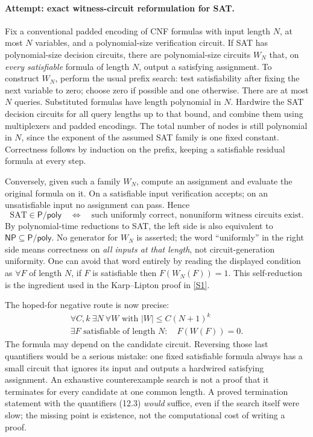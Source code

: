 \documentclass[11pt,a4paper]{article}
\newcommand{\sref}[2]{\hyperlink{source:#1:#2}{[S#2]}}
\begin{document}
\paragraph{Attempt: exact witness-circuit reformulation for SAT.}
Fix a conventional padded encoding of CNF formulas with input length
$N$, at most $N$ variables, and a polynomial-size verification circuit.
If SAT has polynomial-size decision circuits, there are polynomial-size
circuits $W_N$ that, on \emph{every satisfiable} formula of length $N$,
output a satisfying assignment. To construct $W_N$, perform the usual
prefix search: test satisfiability after fixing the next variable to
zero; choose zero if possible and one otherwise. There are at most $N$
queries. Substituted formulas have length polynomial in $N$. Hardwire
the SAT decision circuits for all query lengths up to that bound, and
combine them using multiplexers and padded encodings. The total number
of nodes is still polynomial in $N$, since the exponent of the assumed
SAT family is one fixed constant. Correctness follows by induction on
the prefix, keeping a satisfiable residual formula at every step.

Conversely, given such a family $W_N$, compute an assignment and evaluate
the original formula on it. On a satisfiable input verification accepts;
on an unsatisfiable input no assignment can pass. Hence
\[
 \mathrm{SAT}\in\mathsf{P/poly}
 \quad\Longleftrightarrow\quad
 \text{such uniformly correct, nonuniform witness circuits exist.}
 \tag{12.2}
\]
By polynomial-time reductions to SAT, the left side is also equivalent
to $\mathsf{NP}\subseteq\mathsf{P/poly}$. No generator for $W_N$ is
asserted; the word ``uniformly'' in the right side means correctness on
\emph{all inputs at that length}, not circuit-generation uniformity.
One can avoid that word entirely by reading the displayed condition as
$\forall F$ of length $N$, if $F$ is satisfiable then $F(W_N(F))=1$.
This self-reduction is the ingredient used in the Karp--Lipton proof in
\sref{statement}{1}.

The hoped-for negative route is now precise:
\[
 \begin{gathered}
 \forall C,k\ \exists N\ \forall W\text{ with }|W|\leq C(N+1)^k\\
 \exists F\text{ satisfiable of length }N:\quad F(W(F))=0.
 \end{gathered} \tag{12.3}
\]
The formula may depend on the candidate circuit. Reversing those last
quantifiers would be a serious mistake: one fixed satisfiable formula
always has a small circuit that ignores its input and outputs a
hardwired satisfying assignment. An exhaustive counterexample search
is not a proof that it terminates for every candidate at one common
length. A proved termination statement with the quantifiers (12.3)
\emph{would} suffice, even if the search itself were slow; the missing
point is existence, not the computational cost of writing a proof.
\end{document}
